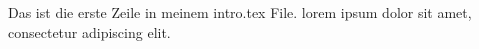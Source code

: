 Das ist die erste Zeile in meinem intro.tex File.
lorem ipsum dolor sit amet, consectetur adipiscing elit.
\cite{caton2024}